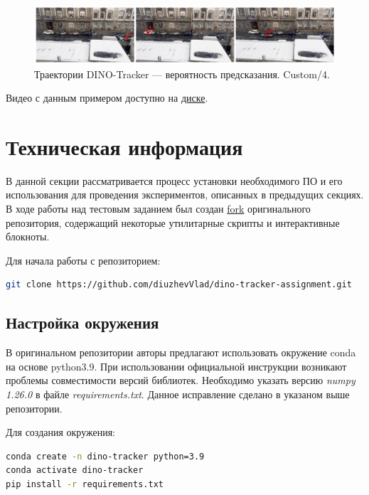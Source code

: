 \documentclass[a4paper, 14pt]{extarticle}
\theoremstyle{definition}
\theoremstyle{plain}
\theoremstyle{remark}
\begin{document}
\begin{figure}
    [H]
    \centering
    \includegraphics[width=\textwidth]{figs/custom-4-probs.png}
    \caption{Траектории DINO-Tracker --- вероятность предсказания. Custom/4.}
    \label{fig:custom-4-probs}
\end{figure}
Видео с данным примером доступно на \href{https://drive.google.com/file/d/1rsrloR8uNc5FJuLP26PqdhpAPDPoifeL/view?usp=drive_link}{диске}.

\newpage


\section{Техническая информация} 
В данной секции рассматривается процесс установки необходимого ПО и его использования для проведения экспериментов, описанных в предыдущих секциях. В ходе работы над тестовым заданием был создан \href{https://github.com/diuzhevVlad/dino-tracker-assignment.git}{fork} оригинального репозитория, содержащий некоторые утилитарные скрипты и интерактивные блокноты. 

Для начала работы с репозиторием:
\lstset{style=mystyle}
\begin{lstlisting}[language=bash]
git clone https://github.com/diuzhevVlad/dino-tracker-assignment.git
\end{lstlisting}

\subsection{Настройка окружения}
В оригинальном репозитории авторы предлагают использовать окружение conda на основе python3.9. При использовании официальной инструкции возникают проблемы совместимости версий библиотек. Необходимо указать версию \textit{numpy 1.26.0} в файле \textit{requirements.txt}. Данное исправление сделано в указаном выше репозитории.

Для создания окружения:
\lstset{style=mystyle}
\begin{lstlisting}[language=bash]
conda create -n dino-tracker python=3.9 
conda activate dino-tracker 
pip install -r requirements.txt
\end{lstlisting}
\end{document}
